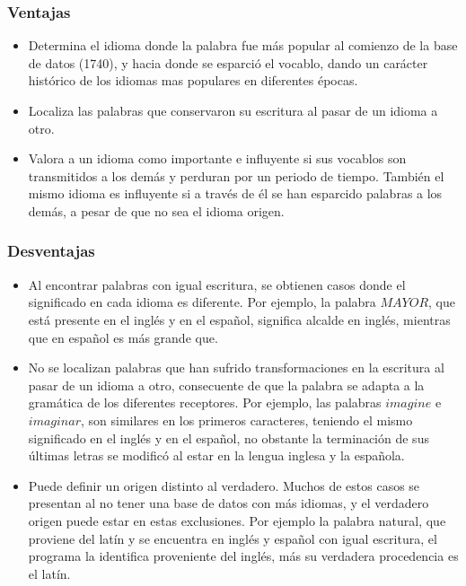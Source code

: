 \subsubsection*{Ventajas}


\begin{itemize}
\item 
Determina el idioma donde la palabra fue más popular al comienzo de
la base de datos (1740), y hacia donde se esparció el vocablo, dando un
carácter histórico de los idiomas mas populares en diferentes épocas. 
\item Localiza las palabras que conservaron su escritura al pasar de un
idioma a otro. 
\item Valora a un idioma como importante e influyente si sus vocablos son
transmitidos a los demás y perduran por un periodo de tiempo. También el mismo
idioma es influyente si a través de él se han esparcido palabras a los demás, a
pesar de que no sea el idioma origen. 
\end{itemize}


\subsubsection*{Desventajas}
\begin{itemize}
\item Al encontrar palabras con igual escritura, se obtienen casos donde
el significado en cada idioma es diferente.  Por ejemplo, la palabra
$\textit{MAYOR}$, que está presente en el inglés y en el español,  significa
alcalde en inglés, mientras que en español es más grande que.
\item No se localizan palabras que han sufrido transformaciones en la
escritura al pasar de un idioma a otro, consecuente de que la palabra se adapta
a la gramática de los diferentes receptores.  Por ejemplo, las palabras
$\textit{imagine}$ e $\textit{imaginar}$, son similares en los primeros
caracteres, teniendo el mismo significado en el inglés y en el español, no
obstante la terminación de  sus últimas letras se modificó al estar en  la
lengua inglesa y la española. 
\item Puede definir un origen distinto al verdadero.  Muchos de estos casos se
presentan al no tener una base de datos con más idiomas, y el verdadero origen
puede estar en estas exclusiones. Por ejemplo la palabra natural, que proviene
del latín y se encuentra en inglés y español con igual escritura,  el programa
la identifica proveniente del inglés, más su verdadera procedencia es el latín. 
\end{itemize}


